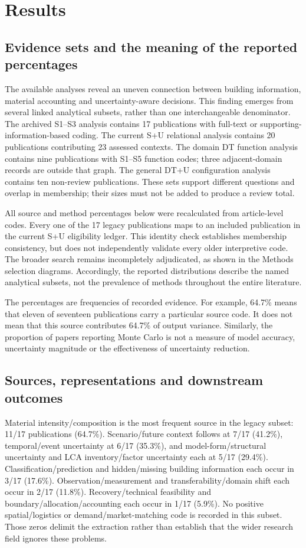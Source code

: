 \section{Results}

\subsection{Evidence sets and the meaning of the reported percentages}
The available analyses reveal an uneven connection between building information, material accounting and uncertainty-aware decisions. This finding emerges from several linked analytical subsets, rather than one interchangeable denominator. The archived S1–S3 analysis contains 17 publications with full-text or supporting-information-based coding. The current S+U relational analysis contains 20 publications contributing 23 assessed contexts. The domain DT function analysis contains nine publications with S1–S5 function codes; three adjacent-domain records are outside that graph. The general DT+U configuration analysis contains ten non-review publications. These sets support different questions and overlap in membership; their sizes must not be added to produce a review total.

All source and method percentages below were recalculated from article-level codes. Every one of the 17 legacy publications maps to an included publication in the current S+U eligibility ledger. This identity check establishes membership consistency, but does not independently validate every older interpretive code. The broader search remains incompletely adjudicated, as shown in the Methods selection diagrams. Accordingly, the reported distributions describe the named analytical subsets, not the prevalence of methods throughout the entire literature.

The percentages are frequencies of recorded evidence. For example, 64.7\% means that eleven of seventeen publications carry a particular source code. It does not mean that this source contributes 64.7\% of output variance. Similarly, the proportion of papers reporting Monte Carlo is not a measure of model accuracy, uncertainty magnitude or the effectiveness of uncertainty reduction.


\subsection{Sources, representations and downstream outcomes}
Material intensity/composition is the most frequent source in the legacy subset: 11/17 publications (64.7\%). Scenario/future context follows at 7/17 (41.2\%), temporal/event uncertainty at 6/17 (35.3\%), and model-form/structural uncertainty and LCA inventory/factor uncertainty each at 5/17 (29.4\%). Classification/prediction and hidden/missing building information each occur in 3/17 (17.6\%). Observation/measurement and transferability/domain shift each occur in 2/17 (11.8\%). Recovery/technical feasibility and boundary/allocation/accounting each occur in 1/17 (5.9\%). No positive spatial/logistics or demand/market-matching code is recorded in this subset. Those zeros delimit the extraction rather than establish that the wider research field ignores these problems.

